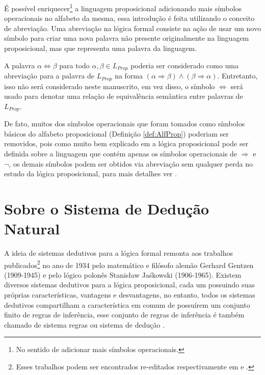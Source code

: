 É possível enriquecer\footnote{No sentido de adicionar mais símbolos operacionais.} a linguagem proposicional adicionando mais símbolos operacionais no alfabeto da mesma, essa introdução é feita utilizando o conceito de abreviação. Uma abreviação na lógica formal consiste na ação de usar um novo símbolo para criar uma nova palavra não presente originalmente na linguagem proposicional, mas que representa uma palavra da linguagem.

\begin{remark}
	A palavra $\alpha \Leftrightarrow \beta$  para todo $\alpha, \beta \in L_{Prop}$ poderia ser considerado como uma abreviação para a palavra de $L_{Prop}$ na forma $(\alpha \Rightarrow \beta) \land (\beta \Rightarrow \alpha)$. Entretanto, isso não será considerado neste manuscrito, em vez disso, o símbolo $\Leftrightarrow$ será usado para denotar uma relação de equivalência semântica entre palavras de $L_{Prop}$. 
\end{remark}

De fato, muitos dos símbolos operacionais que foram tomados como símbolos básicos do alfabeto proposicional (Definição \ref{def:AlfProp}) poderiam ser removidos, pois como muito bem explicado em \cite{BenjaV1, joaoPavao2014} a lógica proposicional pode ser definida sobre a linguagem que contém apenas os símbolos operacionais de $\Rightarrow$ e $\neg$, os demais símbolos podem ser obtidos via abreviação sem qualquer perda no estudo da lógica proposicional, para mais detalhes ver \cite{BenjaV1}.

\section{Sobre o Sistema de Dedução Natural}\label{sec:SistemaDedutivo}

A ideia de sistemas dedutivos para a lógica formal remonta aos trabalhos publicados\footnote{Esses trabalhos podem ser encontrados re-editados respectivamente em \cite{gentzen1969} e \cite{jaskowski1934}.} no ano de 1934 pelo matemático e filósofo alemão Gerhard Gentzen (1909-1945) e pelo lógico polonês Stanisław Jaśkowski (1906-1965). Existem diversos sistemas dedutivos para a lógica proposicional, cada um possuindo suas próprias características, vantagens e desvantagens, no entanto, todos os sistemas dedutivos compartilham a característica em comum de possuírem um conjunto finito de regras de inferência, esse conjunto de regras de inferência é também chamado de sistema regras ou sistema de dedução \cite{edgar2002}.

